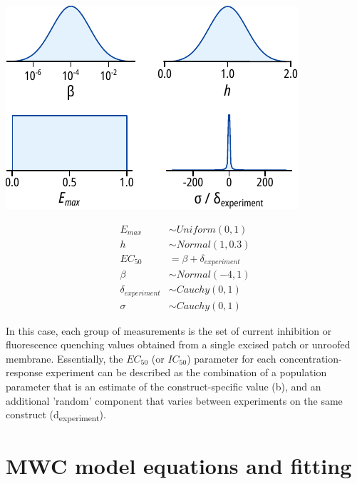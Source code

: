\begin{minipage}{.5\textwidth}
\centering
\includegraphics[width=\textwidth]{drc_priors.pdf}
\end{minipage}
\begin{minipage}{.5\textwidth}
\centering
\begin{equation} \label{eq:drc_priors}
\begin{split}
E_{max} &\sim Uniform(0, 1) \\
h &\sim Normal(1, 0.3) \\
EC_{50} &= \beta + \delta_{experiment} \\
\beta &\sim Normal(-4, 1) \\
\delta_{experiment} &\sim Cauchy(0, 1) \\
\sigma &\sim Cauchy(0, 1)
\end{split}
\end{equation}
\end{minipage}

In this case, each group of measurements is the set of current inhibition or fluorescence quenching values obtained from a single excised patch or unroofed membrane.
Essentially, the $EC_{50}$ (or $IC_{50}$) parameter for each concentration-response experiment can be described as the combination of a population parameter that is an estimate of the construct-specific value (\textgreek{b}), and an additional 'random' component that varies between experiments on the same construct (\textgreek{d}\textsubscript{experiment}).

\section{MWC model equations and fitting}

